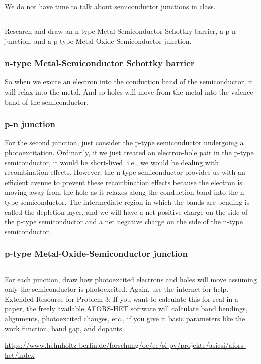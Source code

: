 \documentclass[12pt]{article}
\begin{document}
We do not have time to talk about semiconductor junctions in class.
\subsection{}
Research and draw an n-type Metal-Semiconductor Schottky barrier, a p-n junction, and a p-type Metal-Oxide-Semiconductor junction. 
\subsubsection{n-type Metal-Semiconductor Schottky barrier}
So when we excite an electron into the conduction band of the semiconductor, it will relax into the metal. And so holes will move from the metal into the valence band of the semiconductor.
\subsubsection{p-n junction}
For the second junction, just consider the p-type semiconductor undergoing a photoexcitation. Ordinarily, if we just created an electron-hole pair in the p-type semiconductor, it would be short-lived, i.e., we would be dealing with recombination effects. However, the n-type semiconductor provides us with an efficient avenue to prevent these recombination effects because the electron is moving away from the hole as it relaxes along the conduction band into the n-type semiconductor. The intermediate region in which the bands are bending is called the depletion layer, and we will have a net positive charge on the side of the p-type semiconductor and a net negative charge on the side of the n-type semiconductor.
\subsubsection{p-type Metal-Oxide-Semiconductor junction}
\subsection{}
For each junction, draw how photoexcited electrons and holes will move assuming only the semiconductor is photoexcited. Again, use the internet for help.\\



Extended Resource for Problem 3: If you want to calculate this for real in a paper, the freely available AFORS-HET software will calculate band bendings, alignments, photoexcited changes, etc., if you give it basic parameters like the work function, band gap, and dopants.

\href{https://www.helmholtz-berlin.de/forschung/oe/ee/si-pv/projekte/asicsi/afors-het/index}{https://www.helmholtz-berlin.de/forschung/oe/ee/si-pv/projekte/asicsi/afors-het/index}
\end{document}
